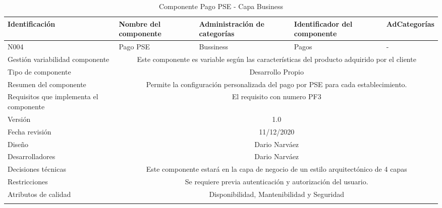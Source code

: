 \documentclass[10pt,a4paper,openany]{book}
\begin{document}
\begin{longtable}{|p{3cm}|p{3cm}|p{3cm}|p{3cm}|p{3cm}|} \hline
Identificación & Nombre del componente & Administración de categorías & Identificador del componente & AdCategorías \\[0.5ex] \hline
N004& Pago PSE& Bussiness& Pagos& -\\[0.5ex] \hline
Gestión variabilidad componente & \multicolumn{4}{|c|}{Este componente es variable según las características del producto adquirido por el cliente} \\ \hline
Tipo de componente & \multicolumn{4}{|c|}{Desarrollo Propio} \\ \hline
Resumen del componente & \multicolumn{4}{|c|}{Permite la configuración personalizada del pago por PSE para cada establecimiento.} \\ \hline
Requisitos que implementa el componente & \multicolumn{4}{|c|}{El requisito con numero PF3 } \\ \hline
Versión & \multicolumn{4}{|c|}{1.0 } \\ \hline
Fecha revisión & \multicolumn{4}{|c|}{ 11/12/2020} \\ \hline
Diseño & \multicolumn{4}{|c|}{Dario Narváez} \\ \hline
Desarrolladores & \multicolumn{4}{|c|}{Dario Narváez} \\ \hline
Decisiones técnicas & \multicolumn{4}{|c|}{Este componente estará en la capa de negocio de un estilo arquitectónico de 4 capas  } \\ \hline
Restricciones & \multicolumn{4}{|c|}{Se requiere previa autenticación y autorización del usuario.} \\ \hline
Atributos de calidad & \multicolumn{4}{|c|}{Disponibilidad, Mantenibilidad y Seguridad} \\ \hline
\caption{Componente Pago PSE - Capa Business}
\label{table:t6}
\end{longtable}
\end{document}
